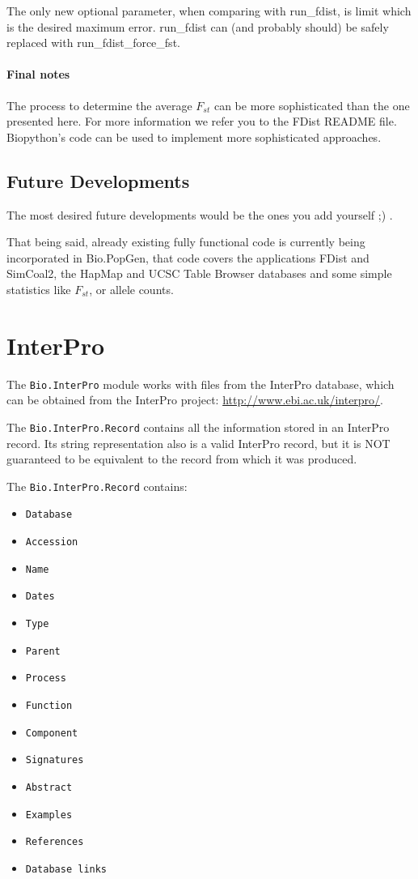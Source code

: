 \documentclass{report}
\begin{document}
The only new optional parameter, when comparing with run\_fdist, is limit
which is the desired maximum error. run\_fdist can (and probably should)
be safely replaced with run\_fdist\_force\_fst.

\paragraph{Final notes}

The process to determine the average $F_{st}$ can be more sophisticated than
the one presented here. For more information we refer you to the FDist
README file. Biopython's code can be used to implement more sophisticated
approaches.

\subsection{Future Developments}

The most desired future developments would be the ones you add yourself ;) .

That being said, already existing fully functional code is currently being
incorporated in Bio.PopGen, that code covers the applications FDist and
SimCoal2, the HapMap and UCSC Table Browser databases and some simple statistics
like $F_{st}$, or allele counts.

\section{InterPro}

The \verb|Bio.InterPro| module works with files from the
InterPro database, which can be obtained from the InterPro project:
\url{http://www.ebi.ac.uk/interpro/}.

The \verb|Bio.InterPro.Record| contains all the information stored in
an InterPro record. Its string representation also is a valid InterPro
record, but it is NOT guaranteed to be equivalent to the record
from which it was produced.

The \verb|Bio.InterPro.Record| contains:

\begin{itemize}
  \item \verb|Database|
  \item \verb|Accession|
  \item \verb|Name|
  \item \verb|Dates|
  \item \verb|Type|
  \item \verb|Parent|
  \item \verb|Process|
  \item \verb|Function|
  \item \verb|Component|
  \item \verb|Signatures|
  \item \verb|Abstract|
  \item \verb|Examples|
  \item \verb|References|
  \item \verb|Database links|
\end{itemize}
\end{document}
